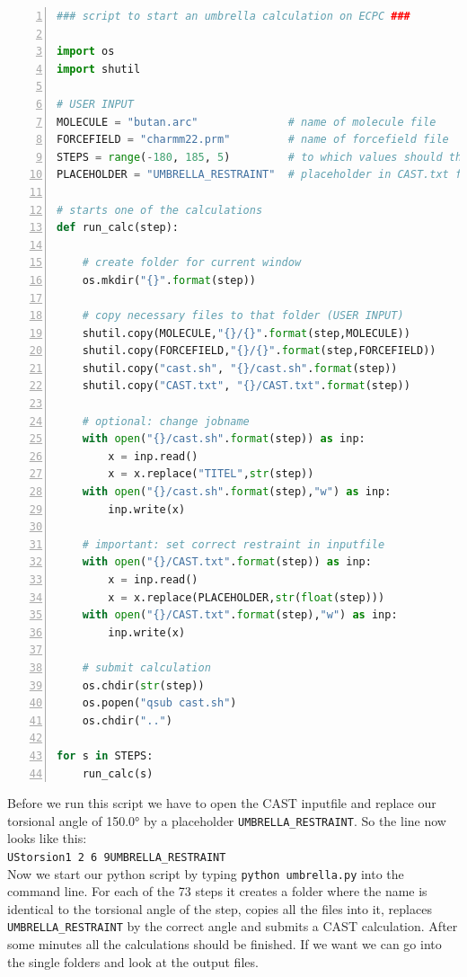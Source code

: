 \documentclass[a4paper,11pt]{scrartcl}
\begin{document}
\begin{lstlisting}[frame=single,language=python,basicstyle=\footnotesize,commentstyle=\color{red},keywordstyle=\color{blue},stringstyle=\color{mygreen},numbers=left]
### script to start an umbrella calculation on ECPC ###

import os
import shutil

# USER INPUT
MOLECULE = "butan.arc"              # name of molecule file
FORCEFIELD = "charmm22.prm"         # name of forcefield file
STEPS = range(-180, 185, 5)         # to which values should the restraint be set?
PLACEHOLDER = "UMBRELLA_RESTRAINT"  # placeholder in CAST.txt file

# starts one of the calculations
def run_calc(step):

    # create folder for current window
    os.mkdir("{}".format(step))  

    # copy necessary files to that folder (USER INPUT)
    shutil.copy(MOLECULE,"{}/{}".format(step,MOLECULE))
    shutil.copy(FORCEFIELD,"{}/{}".format(step,FORCEFIELD))
    shutil.copy("cast.sh", "{}/cast.sh".format(step))
    shutil.copy("CAST.txt", "{}/CAST.txt".format(step))

    # optional: change jobname
    with open("{}/cast.sh".format(step)) as inp:
        x = inp.read()
        x = x.replace("TITEL",str(step))
    with open("{}/cast.sh".format(step),"w") as inp:
        inp.write(x)

    # important: set correct restraint in inputfile
    with open("{}/CAST.txt".format(step)) as inp:
        x = inp.read()
        x = x.replace(PLACEHOLDER,str(float(step)))
    with open("{}/CAST.txt".format(step),"w") as inp:
        inp.write(x)

    # submit calculation
    os.chdir(str(step))
    os.popen("qsub cast.sh")
    os.chdir("..")

for s in STEPS:
    run_calc(s)
\end{lstlisting}

Before we run this script we have to open the CAST inputfile and replace our torsional angle of 150.0° by a placeholder \texttt{UMBRELLA\_RESTRAINT}. So the line now looks like this:\\
\texttt{UStorsion\hspace{2cm}1 2 6 9\quad UMBRELLA\_RESTRAINT}\\
Now we start our python script by typing \texttt{python umbrella.py} into the command line. For each of the 73 steps it creates a folder where the name is identical to the torsional angle of the step, copies all the files into it, replaces \texttt{UMBRELLA\_RESTRAINT} by the correct angle and submits a CAST calculation. After some minutes all the calculations should be finished. If we want we can go into the single folders and look at the output files.
\\
\end{document}
